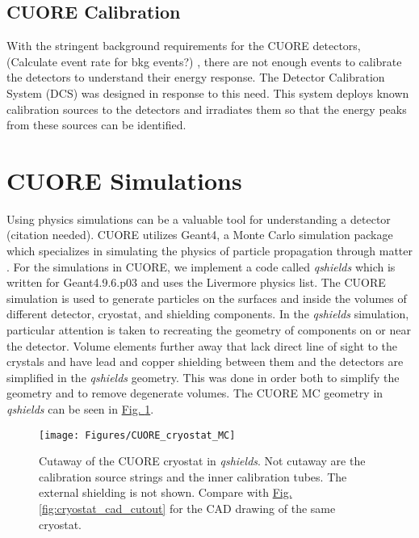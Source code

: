 \documentclass[12pt,a4paper]{article}
\begin{document}
\subsection{CUORE Calibration}

With the stringent background requirements for the CUORE detectors, (\color{red}Calculate event rate for bkg events?\color{black}) , there are not enough events to calibrate the detectors to understand their energy response. The Detector Calibration System (DCS) was designed in response to this need. This system deploys known calibration sources to the detectors and irradiates them so that the energy peaks from these sources can be identified. 


\section{CUORE Simulations}

Using physics simulations can be a valuable tool for understanding a detector (\color{blue}citation needed\color{black}).  CUORE utilizes Geant4, a Monte Carlo simulation package which specializes in simulating the physics of particle propagation through matter \cite{Geant4_1} \cite{Geant4_2}. For the simulations in CUORE, we implement a code called \textit{qshields} which is written for Geant4.9.6.p03 and uses the Livermore physics list. The CUORE simulation is used to generate particles on the surfaces and inside the volumes of different detector, cryostat, and shielding components. In the \textit{qshields} simulation, particular attention is taken to recreating the geometry of components on or near the detector. Volume elements further away that lack direct line of sight to the crystals and have lead and copper shielding between them and the detectors are simplified in the \textit{qshields} geometry. This was done in order both to simplify the geometry and to remove degenerate volumes. The CUORE MC geometry in \textit{qshields} can be seen in \hyperref[fig:cuorecryostatmc]{Fig. \ref*{fig:cuorecryostatmc}}.

\begin{figure}
\centering
\texttt{[image: Figures/CUORE\_cryostat\_MC]}
\caption{Cutaway of the CUORE cryostat in \textit{qshields}. Not cutaway are the calibration source strings and the inner calibration tubes. The external shielding is not shown. Compare with \hyperref[fig:cryostat_cad_cutout]{Fig. \ref*{fig:cryostat_cad_cutout}} for the CAD drawing of the same cryostat.}
\label{fig:cuorecryostatmc}
\end{figure}
\end{document}
